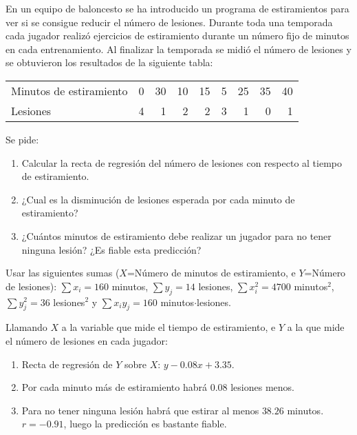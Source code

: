 {En un equipo de baloncesto se ha introducido un programa de estiramientos para ver si se consigue reducir el número de lesiones. Durante
toda una temporada cada jugador realizó ejercicios de estiramiento durante un número fijo de minutos en cada entrenamiento. Al finalizar la
temporada se midió el número de lesiones y se obtuvieron los resultados de la siguiente tabla:
\begin{center}
\begin{tabular}{lrrrrrrrr}
\toprule
Minutos de estiramiento & 0 & 30 & 10 & 15 & 5 & 25 & 35 & 40\\
Lesiones & 4 & 1 & 2 & 2 & 3 & 1 & 0 & 1\\
\bottomrule
\end{tabular}
\end{center}
Se pide:
\begin{enumerate}
\item Calcular la recta de regresión del número de lesiones con respecto al tiempo de estiramiento. 
\item ¿Cual es la disminución de lesiones esperada por cada minuto de estiramiento?
\item ¿Cuántos minutos de estiramiento debe realizar un jugador para no tener ninguna lesión?
¿Es fiable esta predicción?
\end{enumerate}

Usar las siguientes sumas ($X$=Número de minutos de estiramiento, e $Y$=Número de lesiones):
$\sum x_i = 160$ minutos, $\sum y_j=14$ lesiones, $\sum x_i^2= 4700$ minutos$^2$, $\sum y_j^2=36$ lesiones$^2$ y $\sum
x_iy_j=160$  minutos$\cdot$lesiones.
}
{Llamando $X$ a la variable que mide el tiempo de estiramiento, e $Y$ a la que mide el número de lesiones en cada jugador:
\begin{enumerate}
\item Recta de regresión de $Y$ sobre $X$: $y-0.08x+3.35$. 
\item Por cada minuto más de estiramiento habrá $0.08$ lesiones menos.
\item Para no tener ninguna lesión habrá que estirar al menos $38.26$ minutos. $r=-0.91$, luego la predicción es bastante fiable.
\end{enumerate}
}
